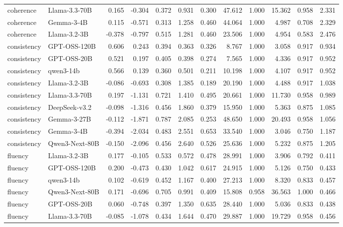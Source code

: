 \begin{table}[t]
{\begin{tabular}{llrrrrrrrrrr}
coherence & Llama-3.3-70B & 0.165 & -0.304 & 0.372 & 0.931 & 0.300 & 47.612 & 1.000 & 15.362 & 0.958 & 2.331 \\
coherence & Gemma-3-4B & 0.115 & -0.571 & 0.313 & 1.258 & 0.460 & 44.064 & 1.000 & 4.987 & 0.708 & 2.329 \\
coherence & Llama-3.2-3B & -0.378 & -0.797 & 0.515 & 1.281 & 0.460 & 23.506 & 1.000 & 4.954 & 0.583 & 2.476 \\
consistency & GPT-OSS-120B & 0.606 & 0.243 & 0.394 & 0.363 & 0.326 & 8.767 & 1.000 & 3.058 & 0.917 & 0.934 \\
consistency & GPT-OSS-20B & 0.521 & 0.197 & 0.405 & 0.398 & 0.274 & 7.565 & 1.000 & 4.336 & 0.917 & 0.952 \\
consistency & qwen3-14b & 0.566 & 0.139 & 0.360 & 0.501 & 0.211 & 10.198 & 1.000 & 4.107 & 0.917 & 0.952 \\
consistency & Llama-3.2-3B & -0.086 & -0.693 & 0.308 & 1.385 & 0.189 & 20.190 & 1.000 & 4.488 & 0.917 & 1.038 \\
consistency & Llama-3.3-70B & 0.197 & -1.131 & 0.721 & 1.410 & 0.495 & 20.661 & 1.000 & 11.730 & 0.958 & 0.989 \\
consistency & DeepSeek-v3.2 & -0.098 & -1.316 & 0.456 & 1.860 & 0.379 & 15.950 & 1.000 & 5.363 & 0.875 & 1.085 \\
consistency & Gemma-3-27B & -0.112 & -1.871 & 0.787 & 2.085 & 0.253 & 48.650 & 1.000 & 20.493 & 0.958 & 1.056 \\
consistency & Gemma-3-4B & -0.394 & -2.034 & 0.483 & 2.551 & 0.653 & 33.540 & 1.000 & 3.046 & 0.750 & 1.187 \\
consistency & Qwen3-Next-80B & -0.150 & -2.096 & 0.456 & 2.640 & 0.526 & 25.636 & 1.000 & 5.232 & 0.875 & 1.205 \\
fluency & Llama-3.2-3B & 0.177 & -0.105 & 0.533 & 0.572 & 0.478 & 28.991 & 1.000 & 3.906 & 0.792 & 0.411 \\
fluency & GPT-OSS-120B & 0.200 & -0.473 & 0.430 & 1.042 & 0.617 & 24.915 & 1.000 & 5.126 & 0.750 & 0.433 \\
fluency & qwen3-14b & 0.102 & -0.619 & 0.452 & 1.167 & 0.400 & 27.213 & 1.000 & 8.320 & 0.833 & 0.457 \\
fluency & Qwen3-Next-80B & 0.171 & -0.696 & 0.705 & 0.991 & 0.409 & 15.808 & 0.958 & 36.563 & 1.000 & 0.466 \\
fluency & GPT-OSS-20B & 0.060 & -0.748 & 0.397 & 1.350 & 0.635 & 28.440 & 1.000 & 5.036 & 0.833 & 0.438 \\
fluency & Llama-3.3-70B & -0.085 & -1.078 & 0.434 & 1.644 & 0.470 & 29.887 & 1.000 & 19.729 & 0.958 & 0.456 \\

\end{tabular}}
\end{table}
